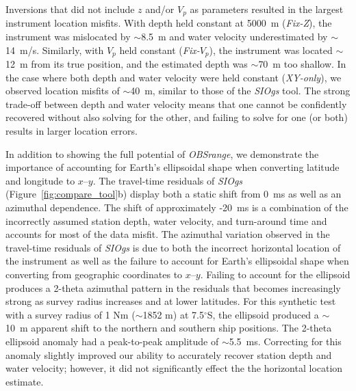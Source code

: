 Inversions that did not include $z$ and/or $V_p$ as parameters resulted in the largest instrument location misfits. With depth held constant at 5000~m (\textit{Fix-Z}), the instrument was mislocated by $\sim$8.5~m and water velocity underestimated by $\sim$14~m/s. Similarly, with $V_p$ held constant (\textit{Fix-$V_p$}), the instrument was located $\sim$12~m from its true position, and the estimated depth was $\sim$70~m too shallow. In the case where both depth and water velocity were held constant (\textit{XY-only}), we observed location misfits of $\sim$40~m, similar to those of the \textit{SIOgs} tool. The strong trade-off between depth and water velocity means that one cannot be confidently recovered without also solving for the other, and failing to solve for one (or both) results in larger location errors.


In addition to showing the full potential of \textit{OBSrange}, we demonstrate the importance of accounting for Earth's ellipsoidal shape when converting latitude and longitude to $x$--$y$. The travel-time residuals of \textit{SIOgs} (Figure~\ref{fig:compare_tool}b) display both a static shift from 0~ms as well as an azimuthal dependence. The shift of approximately -20~ms is a combination of the incorrectly assumed station depth, water velocity, and turn-around time and accounts for most of the data misfit. The azimuthal variation observed in the travel-time residuals of \textit{SIOgs} is due to both the incorrect horizontal location of the instrument as well as the failure to account for Earth's ellipsoidal shape when converting from geographic coordinates to $x$--$y$. Failing to account for the ellipsoid produces a 2-theta azimuthal pattern in the residuals that becomes increasingly strong as survey radius increases and at lower latitudes. For this synthetic test with a survey radius of 1 Nm ($\sim$1852 m) at 7.5$^{\circ}$S, the ellipsoid produced a $\sim$10~m apparent shift to the northern and southern ship positions. The 2-theta ellipsoid anomaly had a peak-to-peak amplitude of $\sim$5.5~ms. Correcting for this anomaly slightly improved our ability to accurately recover station depth and water velocity; however, it did not significantly effect the the horizontal location estimate.

